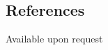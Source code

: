 \documentclass[../main.tex]{subfiles}
\begin{document}
\begin{category}
\section{References}
    \citembullet Available upon request 

\end{category}
\end{document}
